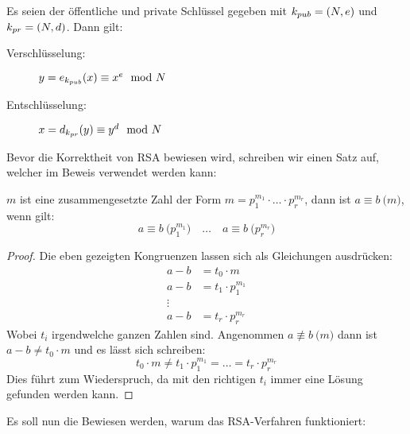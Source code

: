 \begin{definition}
  Es seien der öffentliche und private Schlüssel gegeben mit
  $k_{pub} = (N,e)$ und $k_{pr} = (N,d)$. Dann gilt:
  \begin{description}
    \item[Verschlüsselung:] $y = e_{k_{pub}}(x) \equiv x^e \mod{N}$
    \item[Entschlüsselung:] $x = d_{k_{pr}}(y) \equiv y^d \mod{N}$
  \end{description}
\end{definition}

\noindent
Bevor die Korrektheit von RSA bewiesen wird, schreiben wir einen Satz auf, welcher im
Beweis verwendet werden kann:

\begin{satz}
  \label{satz:composite-mod}
  $m$ ist eine zusammengesetzte Zahl der Form $m = p_1^{m_1} \cdot \ldots \cdot p_r^{m_r}$, dann
  ist $a \equiv b \pod{m}$, wenn gilt:
  \begin{equation*}
    a \equiv b \pod{p_1^{m_1}} \quad\ldots\quad a \equiv b \pod{p_r^{m_r}}
  \end{equation*}
\end{satz}
\begin{proof}
  Die eben gezeigten Kongruenzen lassen sich als Gleichungen ausdrücken:
  \begin{align*}
    a - b & = t_0 \cdot m         \\
    a - b & = t_1 \cdot p_1^{m_1} \\
    \vdots                        \\
    a - b & = t_r \cdot p_r^{m_r}
  \end{align*}
  Wobei $t_i$ irgendwelche ganzen Zahlen sind. Angenommen $a \not\equiv b \pod{m}$ dann ist
  $a - b \neq t_0 \cdot m$ und es lässt sich schreiben:
  \begin{equation*}
    t_0 \cdot m \neq t_1 \cdot p_1^{m_1} = \ldots = t_r \cdot p_r^{m_r}
  \end{equation*}
  Dies führt zum Wiederspruch, da mit den richtigen $t_i$ immer eine Lösung gefunden werden kann.
\end{proof}

\noindent
Es soll nun die Bewiesen werden, warum das RSA-Verfahren funktioniert:

